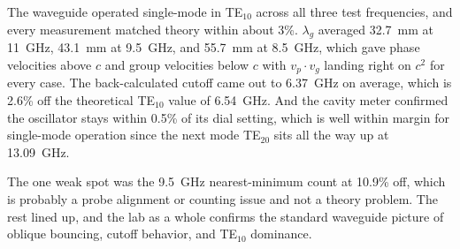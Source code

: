 \documentclass[11pt,letterpaper]{article}
\begin{document}
The waveguide operated single-mode in TE$_{10}$ across all three test frequencies, and every measurement matched theory within about 3\%. $\lambda_g$ averaged 32.7~mm at 11~GHz, 43.1~mm at 9.5~GHz, and 55.7~mm at 8.5~GHz, which gave phase velocities above $c$ and group velocities below $c$ with $v_p \cdot v_g$ landing right on $c^2$ for every case. The back-calculated cutoff came out to 6.37~GHz on average, which is 2.6\% off the theoretical TE$_{10}$ value of 6.54~GHz. And the cavity meter confirmed the oscillator stays within 0.5\% of its dial setting, which is well within margin for single-mode operation since the next mode TE$_{20}$ sits all the way up at 13.09~GHz.

The one weak spot was the 9.5~GHz nearest-minimum count at 10.9\% off, which is probably a probe alignment or counting issue and not a theory problem. The rest lined up, and the lab as a whole confirms the standard waveguide picture of oblique bouncing, cutoff behavior, and TE$_{10}$ dominance.
\end{document}
